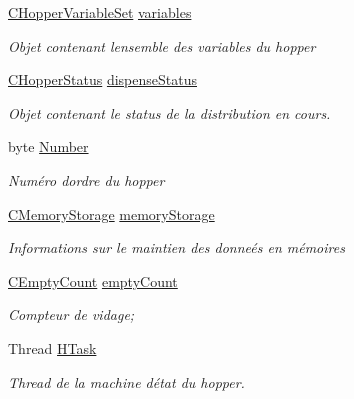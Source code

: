 \begin{DoxyCompactItemize}
\mbox{\hyperlink{class_device_library_1_1_c_hopper_variable_set}{C\+Hopper\+Variable\+Set}} \mbox{\hyperlink{class_device_library_1_1_c_hopper_ab4e4002ee1d9863f6eaf3e67526d4c9a}{variables}}
\begin{DoxyCompactList}\small\item\em Objet contenant l\textquotesingle{}ensemble des variables du hopper \end{DoxyCompactList}\item 
\mbox{\hyperlink{class_device_library_1_1_c_hopper_1_1_c_hopper_status}{C\+Hopper\+Status}} \mbox{\hyperlink{class_device_library_1_1_c_hopper_ab1706fc6c299ceacbbc2d16a11229f41}{dispense\+Status}}
\begin{DoxyCompactList}\small\item\em Objet contenant le status de la distribution en cours. \end{DoxyCompactList}\item 
byte \mbox{\hyperlink{class_device_library_1_1_c_hopper_af41c804396bf26e0d2275a1d90f763e2}{Number}}
\begin{DoxyCompactList}\small\item\em Numéro d\textquotesingle{}ordre du hopper \end{DoxyCompactList}\item 
\mbox{\hyperlink{class_device_library_1_1_c_memory_storage}{C\+Memory\+Storage}} \mbox{\hyperlink{class_device_library_1_1_c_hopper_a3896efcc3ac63f3c01d3871d8f74881d}{memory\+Storage}}
\begin{DoxyCompactList}\small\item\em Informations sur le maintien des donneés en mémoires \end{DoxyCompactList}\item 
\mbox{\hyperlink{class_device_library_1_1_c_hopper_1_1_c_empty_count}{C\+Empty\+Count}} \mbox{\hyperlink{class_device_library_1_1_c_hopper_aa38216ffa60bf350c59c59af0de3fa7b}{empty\+Count}}
\begin{DoxyCompactList}\small\item\em Compteur de vidage; \end{DoxyCompactList}\item 
Thread \mbox{\hyperlink{class_device_library_1_1_c_hopper_acfcffc972c7e842f7bf34140fd320a27}{H\+Task}}
\begin{DoxyCompactList}\small\item\em Thread de la machine d\textquotesingle{}état du hopper. \end{DoxyCompactList}\end{DoxyCompactItemize}
